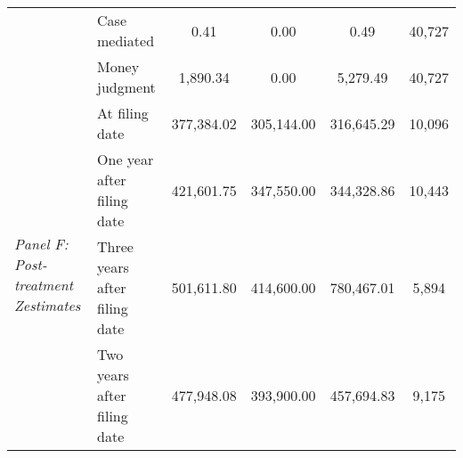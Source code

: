 \begin{tabular}{llcccc}
 & Case mediated & 0.41 & 0.00 & 0.49 & 40,727 \\
 & Money judgment & 1,890.34 & 0.00 & 5,279.49 & 40,727 \\
\cline{1-6}
\multirow[c]{4}{4cm}{\textit{Panel F: Post-treatment Zestimates}} & At filing date & 377,384.02 & 305,144.00 & 316,645.29 & 10,096 \\
 & One year after filing date & 421,601.75 & 347,550.00 & 344,328.86 & 10,443 \\
 & Three years after filing date & 501,611.80 & 414,600.00 & 780,467.01 & 5,894 \\
 & Two years after filing date & 477,948.08 & 393,900.00 & 457,694.83 & 9,175 \\
\cline{1-6}
\bottomrule
\end{tabular}
